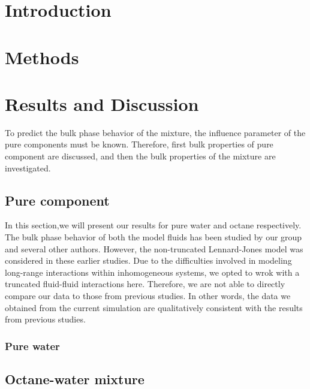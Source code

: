 \documentclass[twoside]{article}
\begin{document}
\begin{multicols}{2} %

\section{Introduction}





\section{Methods}

 




\section{Results and Discussion}
To predict the bulk phase behavior of the mixture, the influence parameter of the pure components must be known. Therefore, first bulk properties of pure component are discussed, and then the bulk properties of the mixture are investigated.
\subsection{Pure component}
In this section,we will present our results for pure water and octane respectively. The bulk phase behavior of both the model fluids has been studied by our group and several other authors. However, the non-truncated Lennard-Jones model was considered in these earlier studies. Due to the difficulties involved in  modeling long-range interactions within inhomogeneous systems, we opted to wrok with a truncated fluid-fluid interactions here. Therefore, we are not able to directly compare our data to those from previous studies. In other words, the data we obtained from the current simulation are qualitatively consistent with the results from previous studies.
\subsubsection{Pure water}

\subsection{Octane-water mixture}

\end{multicols}
\end{document}
